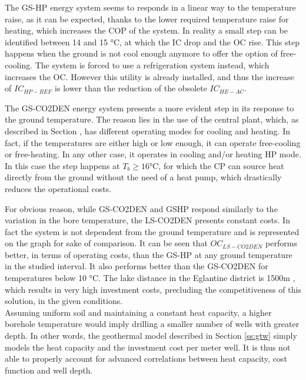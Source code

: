 \documentclass{article}
\begin{document}
The GS-HP energy system seems to responds in a linear way to the temperature raise, as it can be expected, thanks to the lower required temperature raise for heating, which increases the COP of the system. In reality a small step can be identified between 14 and 15 \si{\celsius}, at which the IC drop and the OC rise. This step happens when the ground is not cool enough anymore to offer the option of free-cooling. The system is forced to use a refrigeration system instead, which increases the OC. However this utility is already installed, and thus the increase of $IC_{HP-REF}$ is lower than the reduction of the obsolete $IC_{HE-AC}$.

The GS-CO2DEN energy system presents a more evident step in its response to the ground temperature. The reason lies in the use of the central plant, which, as described in Section , has different operating modes for cooling and heating. In fact, if the temperatures are either high or low enough, it can operate free-cooling or free-heating. In any other case, it operates in cooling and/or heating HP mode. In this case the step happens at $T_{b} \geq 16 \si{\celsius}$, for which the CP can source heat directly from the ground without the need of a heat pump, which drastically reduces the operational costs.

For obvious reason, while GS-CO2DEN and GSHP respond similarly to the variation in the bore temperature, the LS-CO2DEN presents constant costs. In fact the system is not dependent from the ground temperature and is represented on the graph for sake of comparison. It can be seen that $OC_{LS-CO2DEN}$ performs better, in terms of operating costs, than the GS-HP at any ground temperature in the studied interval. It also performs better than the GS-CO2DEN for temperatures below 10 \si{\celsius}. The lake distance in the Eglantine district is 1500m , which results in very high investment costs, precluding the competitiveness of this solution, in the given conditions.\\

Assuming uniform soil and maintaining a constant heat capacity, a higher borehole temperature would imply drilling a smaller number of wells with greater depth. In other words, the geothermal model described in Section \ref{ss:gtw} simply models the heat capacity and the investment cost per meter well. It is thus not able to properly account for advanced correlations between heat capacity, cost function and well depth.
\end{document}
